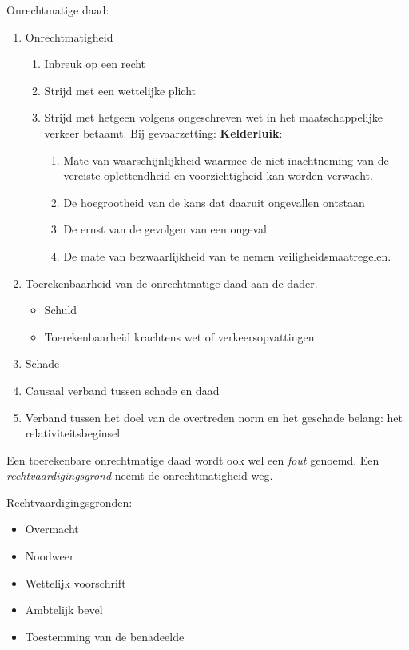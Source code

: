 \documentclass[a4paper]{article}
\begin{document}
Onrechtmatige daad:
\begin{enumerate}
  \item Onrechtmatigheid
    \begin{enumerate}
      \item Inbreuk op een recht
      \item Strijd met een wettelijke plicht
      \item Strijd met hetgeen volgens ongeschreven wet in het
        maatschappelijke verkeer betaamt. Bij gevaarzetting:
        \textbf{Kelderluik}:
        \begin{enumerate} \label{list:kelderluik}
          \item Mate van waarschijnlijkheid waarmee de niet-inachtneming van
            de vereiste oplettendheid en voorzichtigheid kan worden verwacht.
          \item De hoegrootheid van de kans dat daaruit ongevallen ontstaan
          \item De ernst van de gevolgen van een ongeval
          \item De mate van bezwaarlijkheid van te nemen
            veiligheidsmaatregelen.
        \end{enumerate}
    \end{enumerate}
  \item Toerekenbaarheid van de onrechtmatige daad aan de dader.
    \begin{itemize}
      \item Schuld
      \item Toerekenbaarheid krachtens wet of verkeersopvattingen
    \end{itemize}
  \item Schade
  \item Causaal verband tussen schade en daad
  \item Verband tussen het doel van de overtreden norm en het geschade belang:
    het relativiteitsbeginsel
\end{enumerate}

Een toerekenbare onrechtmatige daad wordt ook wel een \emph{fout} genoemd. Een
\emph{rechtvaardigingsgrond} neemt de onrechtmatigheid weg.

Rechtvaardigingsgronden:
\begin{itemize}
  \item Overmacht
  \item Noodweer
  \item Wettelijk voorschrift
  \item Ambtelijk bevel
  \item Toestemming van de benadeelde
\end{itemize}
\end{document}
